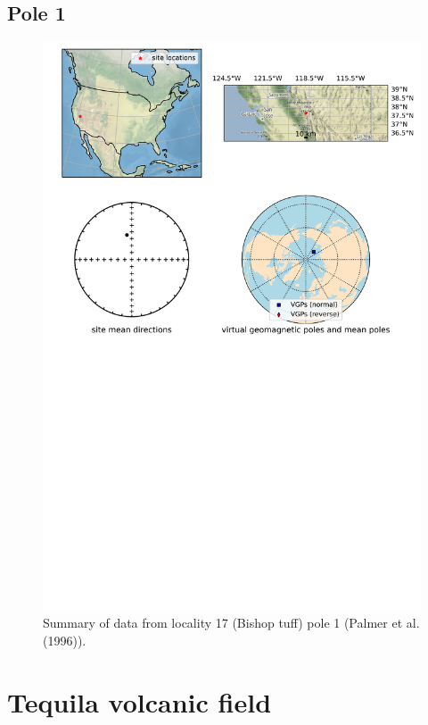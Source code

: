 \subsection{Pole 1}


\begin{figure}[H]
\centering
\includegraphics[width=5 in]{./17/1/pole_summary.png}
\caption{Summary of data from locality 17 (Bishop tuff) pole 1 (Palmer et al. (1996)).}
\end{figure}

\section{Tequila volcanic field}
